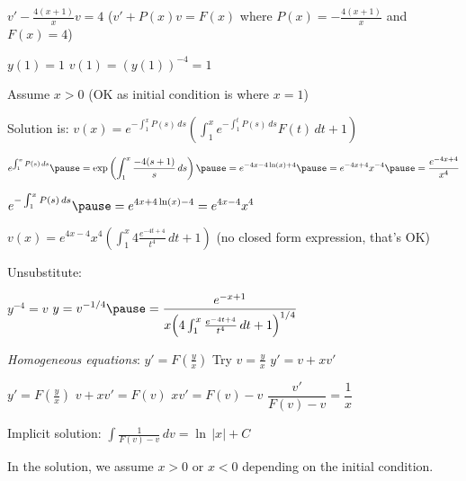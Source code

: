 \documentclass[10pt,aspectratio=169]{beamer}
\begin{document}
\begin{frame}

$v'- \frac{4(x+1)}{x} v  = 4$
\quad
($v' + P(x) v = F(x)$ where $P(x) = - \frac{4(x+1)}{x}$ and $F(x) = 4$)

\medskip
\pause

$y(1) = 1$ \wthus $v(1) = {(y(1))}^{-4} = 1$

\medskip
\pause

Assume $x > 0$ (OK as initial condition is where $x = 1$)

\medskip
\pause

Solution is:
\qquad
$\displaystyle
v(x) = e^{-\int_1^x P(s) \, ds} \left(
\int_1^x 
e^{-\int_1^t P(s) \, ds}
F(t) \, dt
+
1 \right)$

\medskip
\pause

$\displaystyle
e^{\int_1^x P(s)\,ds}
\pause
= \exp \left( \int_1^x \frac{-4(s+1)}{s} \,ds \right)
\pause
=
e^{-4x-4\ln(x)+4}
\pause
= 
e^{-4x+4} x^{-4}
\pause
=
\frac{e^{-4x+4}}{x^4}$

\medskip
\pause

$\displaystyle
e^{-\int_1^x P(s)\,ds}
\pause
=
e^{4x+4\ln(x)-4}
= 
e^{4x-4} x^4$

\medskip
\pause

\thus \quad
$\displaystyle
v(x)
=
e^{4x-4} x^4
\left( \int_{1}^x 4 \frac{e^{-4t+4}}{t^4} \,dt
+ 1 \right)$
\qquad
\pause
(no closed form expression, that's OK)

\medskip
\pause

Unsubstitute:
\medskip

\quad
$y^{-4} = v$
\pause
\wthus
$\displaystyle
y = v^{-1/4}
\pause
= \frac{e^{-x+1}}{x {\left( 4 \int_1^x \frac{e^{-4t+4}}{t^4} \,dt + 1\right)}^{1/4}}$

\end{frame}

\begin{frame}

\emph{Homogeneous equations}:
\quad
$y' = F\left(\frac{y}{x}\right)$
\pause
\quad
Try
$v = \frac{y}{x}$
\pause
\qquad
$y' = v + x v'$

\medskip
\pause

$y' = F\left(\frac{y}{x}\right)$
\wthus
$v+ xv' = F(v)$
\pause
\wthus
$xv' = F(v)-v$
\pause
\wthus
$\dfrac{v'}{F(v)-v} = \dfrac{1}{x}$

\medskip
\pause

Implicit solution:
\quad
$\displaystyle
\int \frac{1}{F(v)-v} \,dv = \ln \, \lvert x \rvert + C$

\medskip
\pause

In the solution, we assume $x > 0$ or $x < 0$ depending on the initial
condition.

\end{frame}
\end{document}
